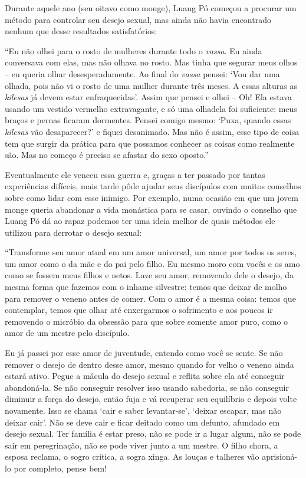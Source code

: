 Durante aquele ano (seu oitavo como monge), Luang Pó começou a procurar
um método para controlar seu desejo sexual, mas ainda não havia
encontrado nenhum que desse resultados satisfatórios:

``Eu não olhei para o rosto de mulheres durante todo o \emph{vassa}. Eu
ainda conversava com elas, mas não olhava no rosto. Mas tinha que
segurar meus olhos -- eu queria olhar desesperadamente. Ao final do
\emph{vassa} pensei: `Vou dar uma olhada, pois não vi o rosto de uma
mulher durante três meses. A essas alturas as \emph{kilesas} já devem
estar enfraquecidas'. Assim que pensei e olhei -- Oh! Ela estava usando
um vestido vermelho extravagante, e só uma olhadela foi suficiente: meus
braços e pernas ficaram dormentes. Pensei comigo mesmo: `Puxa, quando
essas \emph{kilesas} vão desaparecer?' e fiquei desanimado. Mas não é
assim, esse tipo de coisa tem que surgir da prática para que possamos
conhecer as coisas como realmente são. Mas no começo é preciso se
afastar do sexo oposto.''

Eventualmente ele venceu essa guerra e, graças a ter passado por tantas
experiências difíceis, mais tarde pôde ajudar seus discípulos com muitos
conselhos sobre como lidar com esse inimigo. Por exemplo, numa ocasião
em que um jovem monge queria abandonar a vida monástica para se casar,
ouvindo o conselho que Luang Pó dá ao rapaz podemos ter uma ideia melhor
de quais métodos ele utilizou para derrotar o desejo sexual:

``Transforme seu amor atual em um amor universal, um amor por todos os
seres, um amor como o da mãe e do pai pelo filho. Eu mesmo moro com
vocês e os amo como se fossem meus filhos e netos. Lave seu amor,
removendo dele o desejo, da mesma forma que fazemos com o inhame
silvestre: temos que deixar de molho para remover o veneno antes de
comer. Com o amor é a mesma coisa: temos que contemplar, temos que olhar
até enxergarmos o sofrimento e aos poucos ir removendo o micróbio da
obsessão para que sobre somente amor puro, como o amor de um mestre pelo
discípulo.

Eu já passei por esse amor de juventude, entendo como você se sente. Se
não remover o desejo de dentro desse amor, mesmo quando for velho o
veneno ainda estará ativo. Pegue a mácula do desejo sexual e reflita
sobre ela até conseguir abandoná-la. Se não conseguir resolver isso
usando sabedoria, se não conseguir diminuir a força do desejo, então
fuja e vá recuperar seu equilíbrio e depois volte novamente. Isso se
chama `cair e saber levantar-se', `deixar escapar, mas não deixar cair'.
Não se deve cair e ficar deitado como um defunto, afundado em desejo
sexual. Ter família é estar preso, não se pode ir a lugar algum, não se
pode sair em peregrinação, não se pode viver junto a um mestre. O filho
chora, a esposa reclama, o sogro critica, a sogra xinga. As louças e
talheres vão aprisioná-lo por completo, pense bem!

